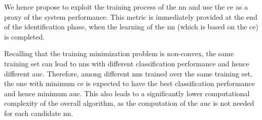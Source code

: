 \documentclass[conference,draftcls,onecolumn]{IEEEtran}
\begin{document}
We hence propose to exploit the training process of the \ac{nn} and use the \ac{ce} as a proxy of the system performance. This metric is immediately provided at the end of the identification phase, when the learning of the \ac{nn} (which is based on the \ac{ce}) is completed.


Recalling that the training minimization problem is non-convex, the same training set can lead to \acp{nn} with different classification performance and hence different \ac{auc}. Therefore, among different \acp{nn} trained over the same training set, the one with minimum \ac{ce} is expected to have the best classification performance and hence minimum \ac{auc}. This also leads to a significantly lower computational complexity of the overall algorithm, as the computation of the \ac{auc} is not needed for each candidate \ac{nn}.
 
\end{document}
